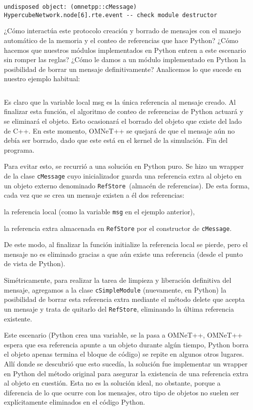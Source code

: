 \documentclass[]{article}
\begin{document}
\begin{verbatim}
undisposed object: (omnetpp::cMessage) HypercubeNetwork.node[6].rte.event -- check module destructor
\end{verbatim}

¿Cómo interactúa este protocolo creación y borrado de mensajes con el manejo
automático de la memoria y el conteo de referencias que hace Python? ¿Cómo
hacemos que nuestros módulos implementados en Python entren a este escenario
sin romper las reglas? ¿Cómo le damos a un módulo implementado en Python la
posibilidad de borrar un mensaje definitivamente? Analicemos lo que sucede en
nuestro ejemplo habitual:

\inputminted{Python}{codelistings/txc1.py}

Es claro que la variable local msg es la única referencia al mensaje creado. Al
finalizar esta función, el algoritmo de conteo de referencias de Python actuará
y se eliminará el objeto. Esto ocasionará el borrado del objeto que existe del
lado de C++. En este momento, OMNeT++ se quejará de que el mensaje aún no debía
ser borrado, dado que este está en el kernel de la simulación. Fin del
programa.

Para evitar esto, se recurrió a una solución en Python puro. Se hizo un wrapper
de la clase \verb!cMessage! cuyo inicializador guarda una referencia extra al objeto
en un objeto externo denominado \verb!RefStore !(almacén de referencias). De esta
forma, cada vez que se crea un mensaje existen a él dos referencias:

la referencia local (como la variable \verb!msg! en el ejemplo anterior),

la referencia extra almacenada en \verb!RefStore! por el constructor de
\verb!cMessage!.

De este modo, al finalizar la función initialize la referencia local se pierde,
pero el mensaje no es eliminado gracias a que aún existe una referencia (desde
el punto de vista de Python). 

Simétricamente, para realizar la tarea de limpieza y liberación definitiva del
mensaje, agregamos a la clase \verb!cSimpleModule! (nuevamente, en Python) la
posibilidad de borrar esta referencia extra mediante el método delete que
acepta un mensaje y trata de quitarlo del \verb!RefStore!, eliminando la última
referencia existente.

Este escenario (Python crea una variable, se la pasa a OMNeT++, OMNeT++ espera
que esa referencia apunte a un objeto durante algún tiempo, Python borra el
objeto apenas termina el bloque de código) se repite en algunos otros lugares.
Allí donde se descubrió que esto sucedía, la solución fue implementar un
wrapper en Python del método original para asegurar la existencia de una
referencia extra al objeto en cuestión. Esta no es la solución ideal, no
obstante, porque a diferencia de lo que ocurre con los mensajes, otro tipo de
objetos no suelen ser explícitamente eliminados en el código Python.
\end{document}
